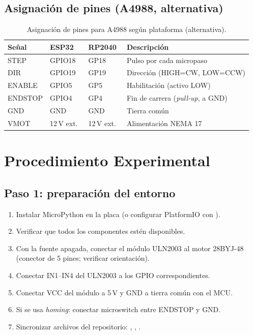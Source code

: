 \documentclass[11pt]{article}
\begin{document}
\subsection{Asignación de pines (A4988, alternativa)}
\begin{table}[H]\centering
\caption{Asignación de pines para A4988 según plataforma (alternativa).}
\begin{tabular}{llll}
\toprule
Señal & ESP32 & RP2040 & Descripción \\
\midrule
STEP & GPIO18 & GP18 & Pulso por cada micropaso \\
DIR & GPIO19 & GP19 & Dirección (HIGH=CW, LOW=CCW) \\
ENABLE & GPIO5 & GP5 & Habilitación (activo LOW) \\
ENDSTOP & GPIO4 & GP4 & Fin de carrera (\emph{pull-up}, a GND) \\
GND & GND & GND & Tierra común \\
VMOT & 12\,V ext.\ & 12\,V ext.\ & Alimentación NEMA 17 \\
\bottomrule
\end{tabular}
\end{table}

\section{Procedimiento Experimental}

\subsection{Paso 1: preparación del entorno}
\begin{enumerate}
  \item Instalar MicroPython en la placa (o configurar PlatformIO con
        ).
  \item Verificar que todos los componentes estén disponibles.
  \item Con la fuente apagada, conectar el módulo ULN2003 al motor 28BYJ-48 (conector
        de 5 pines; verificar orientación).
  \item Conectar IN1--IN4 del ULN2003 a los GPIO correspondientes.
  \item Conectar VCC del módulo a 5\,V y GND a tierra común con el MCU.
  \item Si se usa \emph{homing}: conectar microswitch entre ENDSTOP y GND.
  \item Sincronizar archivos del repositorio: , ,
        .
\end{enumerate}
\end{document}
